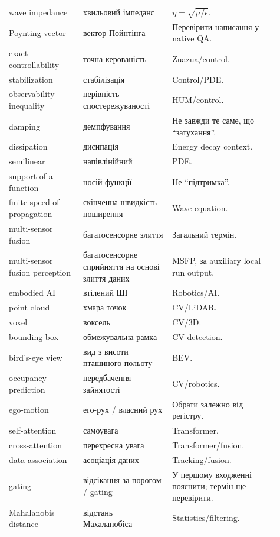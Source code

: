 \begin{longtable}{L{0.25\linewidth}L{0.30\linewidth}L{0.36\linewidth}}
wave impedance & хвильовий імпеданс & $\eta=\sqrt{\mu/\epsilon}$.\\
Poynting vector & вектор Пойнтінга & Перевірити написання у native QA.\\
exact controllability & точна керованість & Zuazua/control.\\
stabilization & стабілізація & Control/PDE.\\
observability inequality & нерівність спостережуваності & HUM/control.\\
damping & демпфування & Не завжди те саме, що ``затухання''.\\
dissipation & дисипація & Energy decay context.\\
semilinear & напівлінійний & PDE.\\
support of a function & носій функції & Не ``підтримка''.\\
finite speed of propagation & скінченна швидкість поширення & Wave equation.\\
multi-sensor fusion & багатосенсорне злиття & Загальний термін.\\
multi-sensor fusion perception & багатосенсорне сприйняття на основі злиття даних & MSFP, за auxiliary local run output.\\
embodied AI & втілений ШІ & Robotics/AI.\\
point cloud & хмара точок & CV/LiDAR.\\
voxel & воксель & CV/3D.\\
bounding box & обмежувальна рамка & CV detection.\\
bird's-eye view & вид з висоти пташиного польоту & BEV.\\
occupancy prediction & передбачення зайнятості & CV/robotics.\\
ego-motion & его-рух / власний рух & Обрати залежно від регістру.\\
self-attention & самоувага & Transformer.\\
cross-attention & перехресна увага & Transformer/fusion.\\
data association & асоціація даних & Tracking/fusion.\\
gating & відсікання за порогом / gating & У першому входженні пояснити; термін ще перевірити.\\
Mahalanobis distance & відстань Махаланобіса & Statistics/filtering.\\
\bottomrule
\end{longtable}
